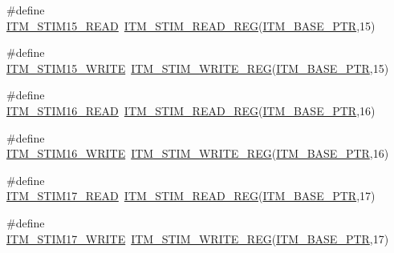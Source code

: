 \begin{DoxyCompactItemize}
\item 
\#define \hyperlink{group___i_t_m___register___accessor___macros_ga3ea562a68b32ba37c430e0b6d2507075}{I\+T\+M\+\_\+\+S\+T\+I\+M15\+\_\+\+R\+E\+AD}~\hyperlink{group___i_t_m___register___accessor___macros_ga5009882336aadcd4f37b45cf3395c450}{I\+T\+M\+\_\+\+S\+T\+I\+M\+\_\+\+R\+E\+A\+D\+\_\+\+R\+EG}(\hyperlink{group___i_t_m___peripheral_gafaddee8fe8b6a898d4e5edc43ee0d703}{I\+T\+M\+\_\+\+B\+A\+S\+E\+\_\+\+P\+TR},15)
\item 
\#define \hyperlink{group___i_t_m___register___accessor___macros_ga5363027769120ac7fd13164c60346eb1}{I\+T\+M\+\_\+\+S\+T\+I\+M15\+\_\+\+W\+R\+I\+TE}~\hyperlink{group___i_t_m___register___accessor___macros_ga049ca92a4e78e77c19af81e51aa73f1c}{I\+T\+M\+\_\+\+S\+T\+I\+M\+\_\+\+W\+R\+I\+T\+E\+\_\+\+R\+EG}(\hyperlink{group___i_t_m___peripheral_gafaddee8fe8b6a898d4e5edc43ee0d703}{I\+T\+M\+\_\+\+B\+A\+S\+E\+\_\+\+P\+TR},15)
\item 
\#define \hyperlink{group___i_t_m___register___accessor___macros_ga9036d1cfac0837b32666e7cb353cfd95}{I\+T\+M\+\_\+\+S\+T\+I\+M16\+\_\+\+R\+E\+AD}~\hyperlink{group___i_t_m___register___accessor___macros_ga5009882336aadcd4f37b45cf3395c450}{I\+T\+M\+\_\+\+S\+T\+I\+M\+\_\+\+R\+E\+A\+D\+\_\+\+R\+EG}(\hyperlink{group___i_t_m___peripheral_gafaddee8fe8b6a898d4e5edc43ee0d703}{I\+T\+M\+\_\+\+B\+A\+S\+E\+\_\+\+P\+TR},16)
\item 
\#define \hyperlink{group___i_t_m___register___accessor___macros_gace1ad469c70d11bf39a60780830605f3}{I\+T\+M\+\_\+\+S\+T\+I\+M16\+\_\+\+W\+R\+I\+TE}~\hyperlink{group___i_t_m___register___accessor___macros_ga049ca92a4e78e77c19af81e51aa73f1c}{I\+T\+M\+\_\+\+S\+T\+I\+M\+\_\+\+W\+R\+I\+T\+E\+\_\+\+R\+EG}(\hyperlink{group___i_t_m___peripheral_gafaddee8fe8b6a898d4e5edc43ee0d703}{I\+T\+M\+\_\+\+B\+A\+S\+E\+\_\+\+P\+TR},16)
\item 
\#define \hyperlink{group___i_t_m___register___accessor___macros_ga3f00966b4f023808c0d22b5c88d9ad84}{I\+T\+M\+\_\+\+S\+T\+I\+M17\+\_\+\+R\+E\+AD}~\hyperlink{group___i_t_m___register___accessor___macros_ga5009882336aadcd4f37b45cf3395c450}{I\+T\+M\+\_\+\+S\+T\+I\+M\+\_\+\+R\+E\+A\+D\+\_\+\+R\+EG}(\hyperlink{group___i_t_m___peripheral_gafaddee8fe8b6a898d4e5edc43ee0d703}{I\+T\+M\+\_\+\+B\+A\+S\+E\+\_\+\+P\+TR},17)
\item 
\#define \hyperlink{group___i_t_m___register___accessor___macros_gab955a13756ae2b569880dbef823a29a4}{I\+T\+M\+\_\+\+S\+T\+I\+M17\+\_\+\+W\+R\+I\+TE}~\hyperlink{group___i_t_m___register___accessor___macros_ga049ca92a4e78e77c19af81e51aa73f1c}{I\+T\+M\+\_\+\+S\+T\+I\+M\+\_\+\+W\+R\+I\+T\+E\+\_\+\+R\+EG}(\hyperlink{group___i_t_m___peripheral_gafaddee8fe8b6a898d4e5edc43ee0d703}{I\+T\+M\+\_\+\+B\+A\+S\+E\+\_\+\+P\+TR},17)

\end{DoxyCompactItemize}
